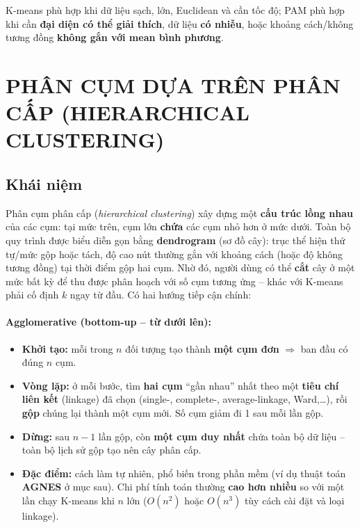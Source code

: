 \documentclass[10pt]{article}
\begin{document}
K-means phù hợp khi dữ liệu sạch, lớn, Euclidean và cần tốc độ; PAM phù hợp khi cần \textbf{đại diện có thể giải thích}, dữ liệu \textbf{có nhiễu}, hoặc khoảng cách/không tương đồng \textbf{không gắn với mean bình phương}.


\section{PHÂN CỤM DỰA TRÊN PHÂN CẤP (HIERARCHICAL CLUSTERING)}

\subsection{Khái niệm}

Phân cụm phân cấp (\textit{hierarchical clustering}) xây dựng một \textbf{cấu trúc lồng nhau} của các cụm: tại mức trên, cụm lớn \textbf{chứa} các cụm nhỏ hơn ở mức dưới. Toàn bộ quy trình được biểu diễn gọn bằng \textbf{dendrogram} (sơ đồ cây): trục thể hiện thứ tự/mức gộp hoặc tách, độ cao nút thường gắn với khoảng cách (hoặc độ không tương đồng) tại thời điểm gộp hai cụm. Nhờ đó, người dùng có thể \textbf{cắt} cây ở một mức bất kỳ để thu được phân hoạch với số cụm tương ứng -- khác với K-means phải cố định $k$ ngay từ đầu.
Có hai hướng tiếp cận chính:

\paragraph{Agglomerative (bottom-up -- từ dưới lên):}
\begin{itemize}
    \item \textbf{Khởi tạo:} mỗi trong $n$ đối tượng tạo thành \textbf{một cụm đơn} $\Rightarrow$ ban đầu có đúng $n$ cụm.
    \item \textbf{Vòng lặp:} ở mỗi bước, tìm \textbf{hai cụm} ``gần nhau'' nhất theo một \textbf{tiêu chí liên kết} (linkage) đã chọn (single-, complete-, average-linkage, Ward,\ldots), rồi \textbf{gộp} chúng lại thành một cụm mới. Số cụm giảm đi 1 sau mỗi lần gộp.
    \item \textbf{Dừng:} sau $n-1$ lần gộp, còn \textbf{một cụm duy nhất} chứa toàn bộ dữ liệu -- toàn bộ lịch sử gộp tạo nên cây phân cấp.
    \item \textbf{Đặc điểm:} cách làm tự nhiên, phổ biến trong phần mềm (ví dụ thuật toán \textbf{AGNES} ở mục sau). Chi phí tính toán thường \textbf{cao hơn nhiều} so với một lần chạy K-means khi $n$ lớn ($O(n^2)$ hoặc $O(n^3)$ tùy cách cài đặt và loại linkage).
\end{itemize}
\end{document}
